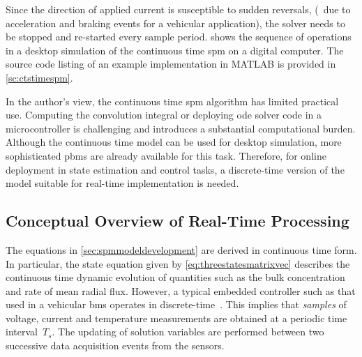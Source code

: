 Since  the direction  of applied  current  is susceptible  to sudden  reversals,
(\eg~due to  acceleration and  braking events  for a  vehicular application),
the  solver   needs  to   be  stopped  and   re-started  every   sample  period.
 shows the  sequence of operations in  a desktop simulation
of  the  continuous time  \gls{spm}  on  a  digital  computer. The  source  code
listing  of  an  example  implementation   in  \textsc{MATLAB}  is  provided  in
\cref{sc:ctstimespm}.


In  the author's  view,  the  continuous time  \gls{spm}  algorithm has  limited
practical  use.  Computing  the  convolution  integral  or  deploying  \gls{ode}
solver code  in a  microcontroller is challenging  and introduces  a substantial
computational burden. Although the continuous time model can be used for desktop
simulation, more sophisticated \glspl{pbm} are  already available for this task.
Therefore,  for online  deployment  in  state estimation  and  control tasks,  a
discrete-time  version of  the model  suitable for  real-time implementation  is
needed.


\subsection{Conceptual Overview of Real-Time Processing}

The equations  in \cref{sec:spmmodeldevelopment} are derived  in continuous time
form. In particular, the  state equation given by \cref{eq:threestatesmatrixvec}
describes  the  continuous   time  dynamic  evolution  of   quantities  such  as
the  bulk  concentration and  rate  of  mean  radial  flux. However,  a  typical
embedded  controller such  as that  used in  a vehicular  \gls{bms} operates  in
discrete-time~\cite{Andrea2010}.  This implies  that \emph{samples}  of voltage,
current  and   temperature  measurements  are   obtained  at  a   periodic  time
interval~$T_s$. The  updating of  solution variables  are performed  between two
successive data acquisition events from the sensors.



